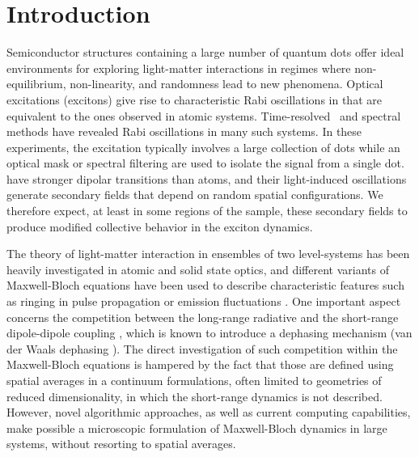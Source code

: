 \section{\label{sec:introduction}Introduction}
Semiconductor structures containing a large number of quantum dots offer ideal environments for exploring light-matter interactions in regimes where non-equilibrium, non-linearity, and randomness lead to new phenomena.
Optical excitations (excitons) give rise to characteristic Rabi oscillations in \qds{} that are equivalent to the ones observed in atomic systems.
Time-resolved~\cite{Stievater2001,shih} and spectral~\cite{kamada} methods have revealed Rabi oscillations in many such systems.
In these experiments, the excitation typically involves a large collection of dots while an optical mask or spectral filtering are used to isolate the signal from a single dot.
\Qds{} have stronger dipolar transitions than atoms, and their light-induced oscillations generate secondary fields that depend on random spatial configurations.
We therefore expect, at least in some regions of the sample, these secondary fields to produce modified collective behavior in the exciton dynamics.

The theory of light-matter interaction in ensembles of two level-systems has been heavily investigated in atomic and solid state optics, and different variants of Maxwell-Bloch equations \cite{Gross1982} have been used to describe characteristic features such as ringing in pulse propagation \cite{Burnham-Chiao PR 188 667 1969,MacGillivray1976} or emission fluctuations \cite{Haake1979}.
One important aspect concerns the competition between the long-range radiative and the short-range dipole-dipole coupling \cite{Coffey1978}, which is known to introduce a dephasing mechanism (van der Waals dephasing \cite{Gross1982}).
The direct investigation of such competition within the Maxwell-Bloch equations is hampered by the fact that those are defined using spatial averages in a continuum formulations, often limited to geometries of reduced dimensionality, in which the short-range dynamics is not described.
However, novel algorithmic approaches, as well as current computing capabilities, make possible a microscopic formulation of Maxwell-Bloch dynamics in large systems, without resorting to spatial averages.


